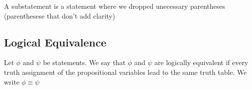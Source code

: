 \documentclass{article}
\begin{document}
\begin{definition}[Substatement]
    A substatement is a statement where we dropped unecessary
    parentheses (parenthesese that don't add clarity)
\end{definition}

\subsection{Logical Equivalence}

\begin{definition}
    Let $\phi$ and $\psi$ be statements. We say that $\phi$ and $\psi$
    are logically equivalent if every truth assignment of the propositional
    variables lead to the same truth table. We write $\phi \equiv \psi$
\end{definition}
\end{document}
